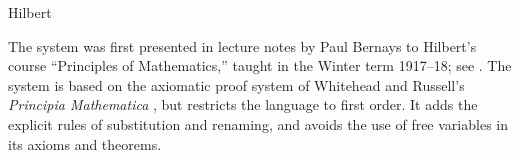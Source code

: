 \begin{entry}{Hilbert}
\begin{history}
The system was first presented in lecture notes by Paul Bernays to Hilbert's
course ``Principles of Mathematics,'' taught in the
Winter term 1917--18; see \cite{Hilbert1917}.  The system
is based on the axiomatic proof system of Whitehead and
Russell's \emph{Principia
Mathematica} , but restricts the
language to first order. It adds the explicit rules of substitution
and renaming, and avoids the use of free variables in its axioms and
theorems.
\end{history}


\end{entry}
